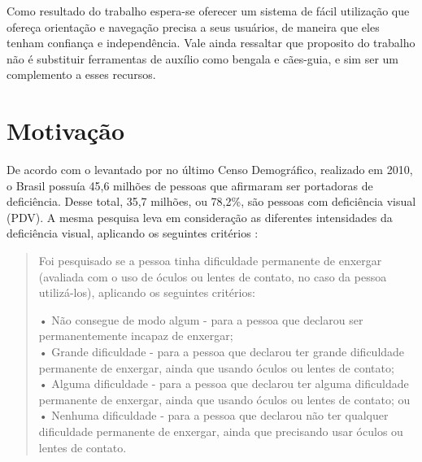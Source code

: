 \documentclass[english,brazilian]{UNISINOSmonografia}
\begin{document}
Como resultado do trabalho espera-se oferecer um sistema de fácil utilização que ofereça orientação e navegação precisa a seus usuários, de maneira que eles tenham confiança e independência. Vale ainda ressaltar que proposito do trabalho não é substituir ferramentas de auxílio como bengala e cães-guia, e sim ser um complemento a esses recursos.

	\section{Motivação}


De acordo com o levantado por  no último Censo Demográfico, realizado em 2010, o Brasil possuía 45,6 milhões de pessoas que afirmaram ser portadoras de deficiência. Desse total, 35,7 milhões, ou 78,2\%, são pessoas com deficiência visual (PDV). A mesma pesquisa leva em consideração as diferentes intensidades da deficiência visual, aplicando os seguintes critérios \cite{IBGE2010}: 

\begin{quote}
	Foi pesquisado se a pessoa tinha dificuldade permanente de enxergar (avaliada com o uso de óculos ou lentes de contato, no caso da pessoa utilizá-los), aplicando os seguintes critérios:
		
	• Não consegue de modo algum - para a pessoa que declarou ser permanentemente incapaz de enxergar; \\
	• Grande dificuldade - para a pessoa que declarou ter grande dificuldade permanente de enxergar, ainda que usando óculos ou lentes de contato; \\
	• Alguma dificuldade - para a pessoa que declarou ter alguma dificuldade permanente de enxergar, ainda que usando óculos ou lentes de contato; ou \\
	• Nenhuma dificuldade - para a pessoa que declarou não ter qualquer dificuldade permanente de enxergar, ainda que precisando usar óculos ou lentes de contato.
\end{quote}
\end{document}
